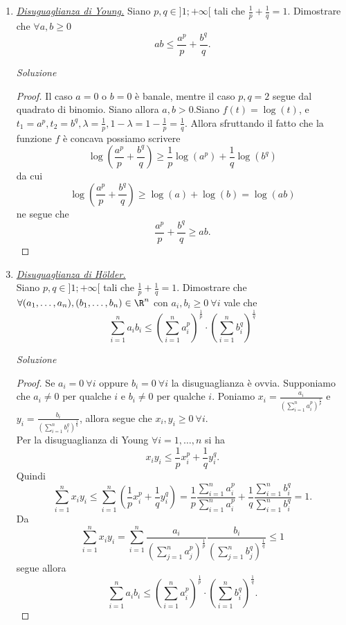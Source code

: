 \documentclass{article}
\begin{document}
\begin{enumerate}[label=\textbf{Esercizio 12.\arabic*.},itemindent=*]
\begin{proof}
    \[(x - y)\frac{f(y +\lambda(x - y))- f(y)}{\lambda(x - y)} \leq f(x) - f(y)\]
    Passando al limite per $\lambda\to 0^+$, dalla derivabilità di $f$ segue 
    \[(x - y)f'(y)\leq f(x) - f(y)\]
    ossia 
    \[f(x)\geq f(y) + f'(y)(x - y).\]
    Per l'arbitrarietà di $x,y\in \R$, la dimostrazione è conclusa.
\end{proof}
\item \underline{\textit{Disuguaglianza di Young.}} Siano $p, q\in ]1;+\infty[$ tali che $\frac{1}{p}+\frac{1}{q}=1$. Dimostrare che $\forall a,b\geq 0$ 
\[ab\leq \frac{a^p}{p}+\frac{b^q}{q}.\]
\item[\textit{\large Soluzione~}]~
\begin{proof}
    Il caso $a=0$ o $b=0$ è banale, mentre il caso $p,q=2$ segue dal quadrato di binomio. Siano allora $a,b>0$.Siano $f(t)=\log(t)$, e $t_1=a^p, t_2=b^q, \lambda =\frac{1}{p}, 1-\lambda=1-\frac{1}{p}=\frac{1}{q}$.
    Allora sfruttando il fatto che la funzione $f$ è concava possiamo scrivere
    \[\log\left( \frac{a^p}{p}+\frac{b^q}{q} \right)\geq \frac{1}{p}\log(a^p) +\frac{1}{q}\log(b^q)\]
    da cui
    \[\log\left( \frac{a^p}{p}+\frac{b^q}{q} \right)\geq \log(a)+\log(b)=\log(ab)\]
    ne segue che 
    \[\frac{a^p}{p}+\frac{b^q}{q}\geq ab.\]
\end{proof}
\item \underline{\textit{Disuguaglianza di Hölder.}} \\Siano $p, q\in ]1;+\infty[$ tali che $\frac{1}{p}+\frac{1}{q}=1$. Dimostrare che $\forall (a_1, \dots, a_n), (b_1,\dots, b_n)\in \R^n$ con $a_i, b_i\geq 0~\forall i$ vale che 
\[\sum_{i=1}^n a_ib_i\leq \left(\sum_{i=1}^na_i^p\right)^{\frac{1}{p}}\cdot\left(\sum_{i=1}^nb_i^q\right)^{\frac{1}{q}}\]
\item[\textit{\large Soluzione~}]~
\begin{proof}
   Se $a_i=0~\forall i$ oppure $b_i=0~\forall i$ la disuguaglianza è ovvia. Supponiamo che $a_i\neq 0$ per qualche $i$ e $b_i\neq 0$ per qualche $i$. Poniamo $x_i=\frac{a_i}{\left(\sum\limits_{i=1}^na_i^p\right)^{\frac{1}{p}}}$ e $y_i=\frac{b_i}{\left(\sum\limits_{i=1}^nb_i^q\right)^{\frac{1}{q}}}$, allora segue che $x_i,y_i\geq 0~\forall i$.
   \\Per la disuguaglianza di Young $\forall i=1, \dots, n$ si ha
   \[x_iy_i\leq \frac{1}{p}x_i^p+\frac{1}{q}y_i^q.\]
   Quindi 
   \[\sum\limits_{i=1}^nx_iy_i\leq\sum\limits_{i=1}^n\left( \frac{1}{p}x_i^p+\frac{1}{q}y_i^q\right)=\frac{1}{p}\frac{\sum\limits_{i=1}^na_i^p}{\sum\limits_{i=1}^na_i^p}+\frac{1}{q}\frac{\sum\limits_{i=1}^nb_i^q}{\sum\limits_{i=1}^nb_i^q}=1.\]
   Da
   \[\sum_{i = 1}^nx_iy_i =\sum_{i = 1}^n\frac{a_i}{(\sum_{j = 1}^n a_j^p)^{\frac{1}{p}}}\frac{b_i}{(\sum_{j = 1}^n b_j^q)^{\frac{1}{q}}}\leq 1\]
   segue allora
   \[\sum_{i=1}^n a_ib_i\leq \left(\sum_{i=1}^na_i^p\right)^{\frac{1}{p}} \cdot \left(\sum_{i=1}^nb_i^q\right)^{\frac{1}{q}}.\]
\end{proof}


\end{enumerate}
\end{document}
